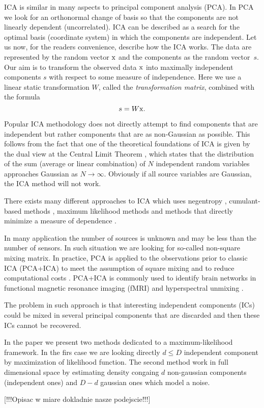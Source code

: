 ICA is similar in many aspects to principal component analysis (PCA). In PCA we look for an orthonormal change of basis so that the components are not
linearly dependent (uncorrelated).
ICA can be described as a search for the optimal basis (coordinate system) in which the components are independent. Let us now, for the readers convenience, describe how the 
ICA works. The data are represented by the random vector $\mathrm{x}$
 and the components as the random vector~$s$.  Our aim is to transform the observed data $\mathrm{x}$ into maximally independent components $s$ with respect to some measure  
of independence. Here we use a linear static transformation $W$, called the {\em transformation matrix}, combined with the formula 
$$
s = W \mathrm{x}.
$$

Popular ICA methodology does not directly attempt to find components that are independent but rather components that are as non-Gaussian as possible.
This follows from the fact that one of the theoretical foundations of ICA is given by the dual view at the Central Limit Theorem \cite{hyvarinen2000independent}, which states that the distribution of the sum (average or linear combination) of $N$ independent random variables approaches Gaussian as  $N\rightarrow \infty$. Obviously if all source variables are Gaussian, the ICA method will not work. 

There exists many different approaches to ICA which uses negentropy \cite{hyvarinen2000independent}, cumulant-based methods \cite{cardoso1993blind,virta2015joint}, maximum likelihood methods \cite{chen2006efficient,samworth2012independent} and methods that directly minimize a measure of dependence \cite{stogbauer2004least,matteson2016independent}.

In many application the number of sources is unknown and may be less than the number of sensors. In such situation we are looking for so-called non-square mixing matrix.
In practice, PCA is applied to the observations prior to classic ICA (PCA+ICA) to meet the assumption of square mixing and to reduce computational
costs \cite{hyvarinen2004independent}. PCA+ICA is commonly used to identify brain networks
in functional magnetic resonance imaging (fMRI) \cite{beckmann2012modelling,green2002pca} and hyperspectral unmixing \cite{wang2015abundance,caiafa2008blind}.

The problem in such approach is that interesting independent components (ICs) could be mixed in several principal components that are discarded and then these ICs cannot be recovered.

In the paper we present two methods dedicated to a maximum-likelihood framework. In the firs case we are looking directly $d \leq D$ independent component by maximization of likelihood function. The second method work in full dimensional space by  estimating density congaing $d$ non-gaussian components (independent ones) and $D-d$ gaussian ones which model a noise.  

[!!!Opisac w miare dokladnie nasze podejscie!!!]


